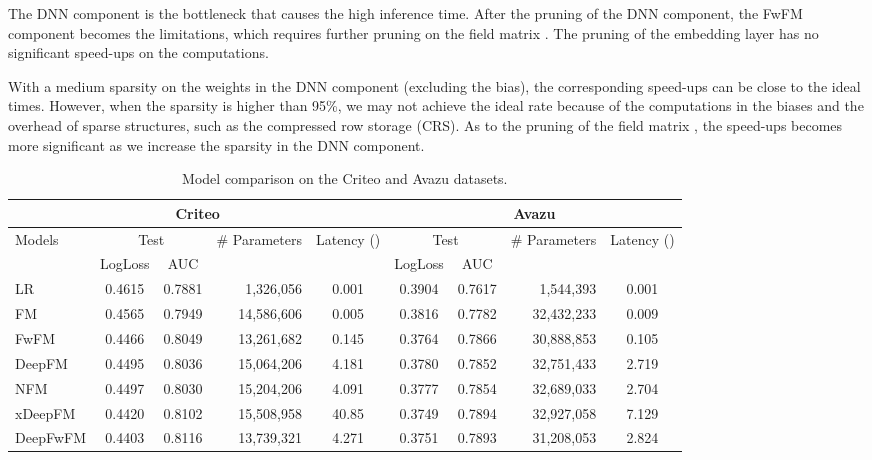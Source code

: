 \documentclass[sigconf]{acmart}
\begin{document}
The DNN component is the bottleneck that causes the high inference time. After the pruning of the DNN component, the FwFM component becomes the limitations, which requires further pruning on the field matrix . The pruning of the embedding layer has no significant speed-ups on the computations. 

With a medium  sparsity on the weights in the DNN component (excluding the bias), the corresponding speed-ups can be close to the ideal  times. However, when the sparsity  is higher than 95\%, we may not achieve the ideal rate because of the computations in the biases and the overhead of sparse structures, such as the compressed row storage (CRS). As to the pruning of the field matrix , the speed-ups becomes more significant as we increase the sparsity  in the DNN component. 




\begin{table*}
 \caption{Model comparison on the Criteo and Avazu datasets.}
  \centering
\begin{tabular}{lccrc|ccrc}
    \toprule
    \multicolumn{5}{c|}{Criteo} & \multicolumn{4}{c}{Avazu} \\  
    \midrule
    \multirow{2}{*}{Models}    & \multicolumn{2}{c}{Test} & \multirow{2}{*}{\# Parameters} & \multirow{2}{*}{Latency ()}  & \multicolumn{2}{c}{Test} & \multirow{2}{*}{\# Parameters} & \multirow{2}{*}{Latency ()}  \\
      & LogLoss   & AUC &  &  & LogLoss & AUC & & \\
    \midrule
    LR      &   0.4615 & 0.7881 & 1,326,056 & 0.001 & 0.3904 & 0.7617 & 1,544,393 & 0.001 \\
    FM        & 0.4565 & 0.7949  & 14,586,606 & 0.005 &  0.3816 & 0.7782 & 32,432,233 & 0.009 \\
     FwFM        & 0.4466 & 0.8049  & 13,261,682 & 0.145 &  0.3764 & 0.7866  & 30,888,853 & 0.105 \\
    \midrule
    DeepFM    & 0.4495 & 0.8036 & 15,064,206 & 4.181 & 0.3780 & 0.7852 & 32,751,433 & 2.719    \\
    NFM        &  0.4497 & 0.8030  & 15,204,206 & 4.091 & 0.3777 & 0.7854 & 32,689,033 &  2.704 \\
    xDeepFM      & 0.4420 & 0.8102 & 15,508,958 & 40.85 &  0.3749 & 0.7894 & 32,927,058 & 7.129 \\
    \midrule
    DeepFwFM    & 0.4403 & 0.8116 & 13,739,321 & 4.271 & 0.3751 & 0.7893  & 31,208,053 & 2.824 \\
    \bottomrule
  \end{tabular}
  \vspace{1em}
  \label{criteo_data}
\end{table*}
\end{document}
